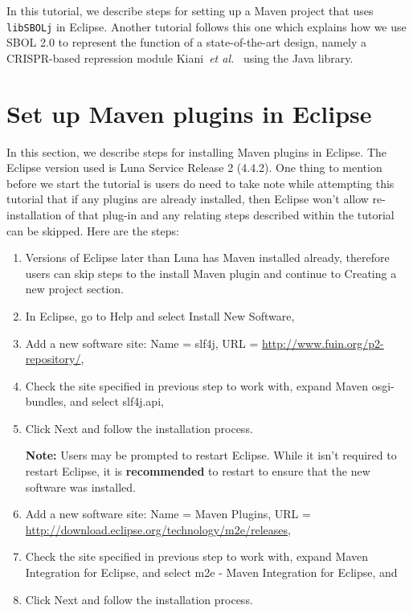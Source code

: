 \noindent In this tutorial, we describe steps for setting up a Maven
project that uses {\tt libSBOLj} in Eclipse. Another tutorial follows this one which explains how we use SBOL
2.0 to represent the function of a state-of-the-art design, namely a
CRISPR-based repression module Kiani~\textit{et
  al.}~\cite{kiani2014crispr} using the Java library. 

\section*{Set up Maven plugins in Eclipse}
In this section, we describe steps for installing Maven plugins in Eclipse. The Eclipse version used is Luna Service Release 2 (4.4.2). One thing to mention before we start the tutorial is users do need to take note while attempting this tutorial that if any plugins are already installed, then Eclipse won't allow re-installation of that plug-in and any relating steps described within the tutorial can be skipped. Here are the steps:
\begin{enumerate}
\item Versions of Eclipse later than Luna has Maven installed already, therefore users can skip steps to the install Maven plugin and continue to Creating a new project section.
\item In Eclipse, go to Help and select Install New Software,
\item Add a new software site: Name = slf4j, URL = \url{http://www.fuin.org/p2-repository/}, 
\item Check the site specified in previous step to work with, expand Maven osgi-bundles, and select slf4j.api, 
\item Click Next and follow the installation process.

\quad \textbf{Note:} Users may be prompted to restart Eclipse. While it isn't required to restart Eclipse, it is \textbf{recommended} to restart to ensure that the new software was installed.   

\item Add a new software site: Name = Maven Plugins, URL = \url{http://download.eclipse.org/technology/m2e/releases}, 
\item Check the site specified in previous step to work with, expand Maven Integration for Eclipse, and select m2e - Maven Integration for Eclipse, and
\item Click Next and follow the installation process.
\end{enumerate}

